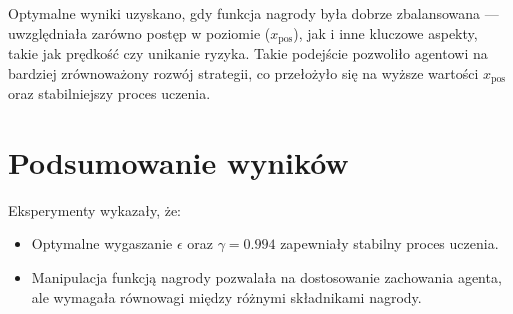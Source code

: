 Optymalne wyniki uzyskano, gdy funkcja nagrody była dobrze zbalansowana — uwzględniała zarówno postęp w poziomie (\(x_{\text{pos}}\)), jak i inne kluczowe aspekty, takie jak prędkość czy unikanie ryzyka. Takie podejście pozwoliło agentowi na bardziej zrównoważony rozwój strategii, co przełożyło się na wyższe wartości \(x_{\text{pos}}\) oraz stabilniejszy proces uczenia.

\section{Podsumowanie wyników}

Eksperymenty wykazały, że:
\begin{itemize}
	\item Optymalne wygaszanie \(\epsilon\) oraz \(\gamma = 0.994\) zapewniały stabilny proces uczenia.
	\item Manipulacja funkcją nagrody pozwalała na dostosowanie zachowania agenta, ale wymagała równowagi między różnymi składnikami nagrody.
\end{itemize}
